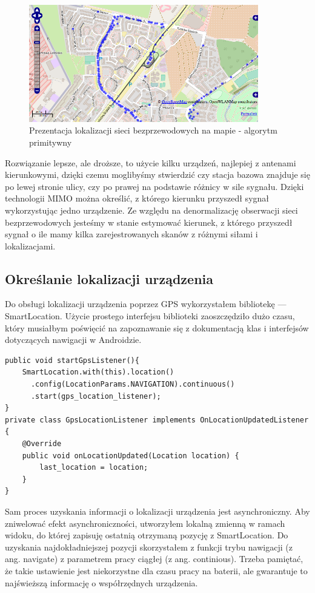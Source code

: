 \begin{figure}[h!]
  \centering
    \includegraphics[width=10cm]{images/poor-scan-result}
  \caption{Prezentacja lokalizacji sieci bezprzewodowych na mapie - algorytm primitywny}
  \label{fig:poor-scan-result}
\end{figure}

Rozwiązanie lepsze, ale droższe, to użycie kilku urządzeń, najlepiej z antenami kierunkowymi, dzięki czemu moglibyśmy stwierdzić czy stacja bazowa znajduje się po lewej stronie ulicy, czy po prawej na podstawie różnicy w sile sygnału. Dzięki technologii MIMO można określić, z którego kierunku przyszedł sygnał wykorzystując jedno urządzenie. Ze względu na denormalizację obserwacji sieci bezprzewodowych jesteśmy w stanie estymować kierunek, z którego przyszedł sygnał o ile mamy kilka zarejestrowanych skanów z różnymi siłami i lokalizacjami.

\subsection{Określanie lokalizacji urządzenia}
Do obsługi lokalizacji urządzenia poprzez GPS wykorzystałem bibliotekę — SmartLocation. Użycie prostego interfejsu biblioteki zaoszczędziło dużo czasu, który musiałbym poświęcić na zapoznawanie się z dokumentacją klas i interfejsów dotyczących nawigacji w Androidzie.

\begin{verbatim}
public void startGpsListener(){
    SmartLocation.with(this).location()
      .config(LocationParams.NAVIGATION).continuous()
      .start(gps_location_listener);
}
private class GpsLocationListener implements OnLocationUpdatedListener {
    @Override
    public void onLocationUpdated(Location location) {
        last_location = location;
    }
}
\end{verbatim}

Sam proces uzyskania informacji o lokalizacji urządzenia jest asynchroniczny. Aby zniwelować efekt asynchroniczności, utworzyłem lokalną zmienną w ramach widoku, do której zapisuję ostatnią otrzymaną pozycję z SmartLocation. Do uzyskania najdokładniejszej pozycji skorzystałem z funkcji trybu nawigacji (z ang. navigate) z parametrem pracy ciągłej (z ang. continious). Trzeba pamiętać, że takie ustawienie jest niekorzystne dla czasu pracy na baterii, ale gwarantuje to najświeższą informację o współrzędnych urządzenia.

